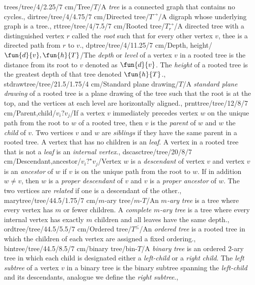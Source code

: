 trees/tree/4/2.25/7 cm/Tree/$T$/{A \emph{tree} is a connected graph that contains no cycles.},%
dirtree/tree/4/4.75/7 cm/{Directed tree}/{$T^{\rightarrow}$}/{A digraph whose underlying graph is a tree.},%
rttree/tree/4/7.5/7 cm/{Rooted tree}/{$T^{\rightarrow}_r$}/{A directed tree with a distinguished vertex $r$ called the \emph{root} such that for every other vertex $v$, thee is a directed path from $r$ to $v$.},%
dptree/tree/4/11.25/7 cm/{Depth, height}/{$\fun{d}{v},\fun{h}{T}$}/{The \emph{depth} or \emph{level} of a vertex $v$ in a rooted tree is the distance from its root to $v$ denoted as $\fun{d}{v}$. The \emph{height} of a rooted tree is the greatest depth of that tree denoted $\fun{h}{T}$.},%
stdrawtree/tree/21.5/1.75/4 cm/{Standard plane drawing}/{\smallpencil $T$}/{A \emph{standard plane drawing} of a rooted tree is a plane drawing of the tree such that the root is at the top, and the vertices at each level are horizontally aligned.},%
prnttree/tree/12/8/7 cm/{Parent,child}/{$v_i ? v_j$}/{If a vertex $v$ immediately precedes vertex $w$ on the unique path from the root to $w$ of a rooted tree, then $v$ is the \emph{parent} of $w$ and $w$ the \emph{child} of $v$. Two vertices $v$ and $w$ are \emph{siblings} if they have the same parent in a rooted tree. A vertex that has no children is an \emph{leaf}. A vertex in a rooted tree that is not a \emph{leaf} is an \emph{internal vertex}.},%
dscasctree/tree/20/8/7 cm/{Descendant,ancestor}/{$v_i ?^{\star} v_j$}/{Vertex $w$ is a \emph{descendant} of vertex $v$ and vertex $v$ is an \emph{ancestor} of $w$ if $v$ is on the unique path from the root to $w$. If in addition $w\neq v$, then $w$ is a \emph{proper descendant} of $v$ and $v$ is a \emph{proper ancestor} of $w$. The two vertices are \emph{related} if one is a descendant of the other.},%
marytree/tree/44.5/1.75/7 cm/{$m$-ary tree}/{$m$-$T$}/{An \emph{$m$-ary tree} is a tree where every vertex has $m$ or fewer children. A \emph{complete $m$-ary tree} is a tree where every internal vertex has exactly $m$ children and all leaves have the same depth.},%
ordtree/tree/44.5/5.5/7 cm/{Ordered tree}/{$T^{\leq}$}/{An \emph{ordered tree} is a rooted tree in which the children of each vertex are assigned a fixed ordering.},%
bintree/tree/44.5/8.5/7 cm/{binary tree}/{bin-$T$}/{A \emph{binary tree} is an ordered $2$-ary tree in which each child is designated either a \emph{left-child} or a \emph{right child}. The \emph{left subtree} of a vertex $v$ in a binary tree is the binary
 subtree spanning the \emph{left-child} and its descendants, analogue we define the \emph{right subtree}.},%
